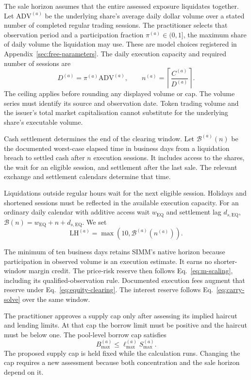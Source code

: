 The sale horizon assumes that the entire assessed exposure liquidates together.
Let $\mathrm{ADV}^{(a)}$ be the underlying share's average daily dollar volume over
a stated number of completed regular trading sessions. The practitioner selects
that observation period and a participation fraction $\pi^{(a)}\in(0,1]$, the
maximum share of daily volume the liquidation may use. These are model choices
registered in Appendix~\ref{sec:free-parameters}. The daily execution capacity and
required number of sessions are
\begin{equation}\label{eq:equity-sessions}
D^{(a)}=\pi^{(a)}\mathrm{ADV}^{(a)},
\qquad
n^{(a)}=\left\lceil\frac{C^{(a)}}{D^{(a)}}\right\rceil.
\end{equation}
The ceiling applies before rounding any displayed volume or cap. The volume
series must identify its source and observation date. Token trading volume and
the issuer's total market capitalisation cannot substitute for the underlying
share's executable volume.

Cash settlement determines the end of the clearing window. Let
$\mathcal{B}^{(a)}(n)$ be the documented worst-case elapsed time in business days
from a liquidation breach to settled cash after $n$ execution sessions. It includes
access to the shares, the wait for an eligible session, and settlement after the
last sale. The relevant exchange and settlement calendars determine that time.

Liquidations outside regular hours wait for the next eligible session. Holidays
and shortened sessions must be reflected in the available execution capacity.
For an ordinary daily calendar with additive access wait $w_{\mathrm{EQ}}$ and
settlement lag $d_{s,\mathrm{EQ}}$, $\mathcal{B}(n)=w_{\mathrm{EQ}}+n+d_{s,\mathrm{EQ}}$.
We set
\begin{equation}\label{eq:equity-lh}
\mathrm{LH}^{(a)}=\max\!\left(10,\mathcal{B}^{(a)}(n^{(a)})\right).
\end{equation}

The minimum of ten business days retains SIMM's native horizon because participation
in observed volume is an execution estimate. It earns no shorter-window margin
credit. The price-risk reserve then follows Eq.~\eqref{eq:m-scaling}, including
its qualified-observation rule. Documented execution fees augment that reserve
under Eq.~\eqref{eq:equity-clearing}. The interest reserve follows
Eq.~\eqref{eq:carry-solve} over the same window.

The practitioner approves a supply cap only after assessing its implied haircut
and lending limits. At that cap the borrow limit must be positive and the haircut
must be below one. The pool-level borrow cap satisfies
\begin{equation}\label{eq:equity-caps}
B_{\max}^{(a)}\le\ell_{\max}^{(a)}S_{\max}^{(a)}.
\end{equation}
The proposed supply cap is held fixed while the calculation runs. Changing the
cap requires a new assessment because both concentration and the sale horizon
depend on it.

